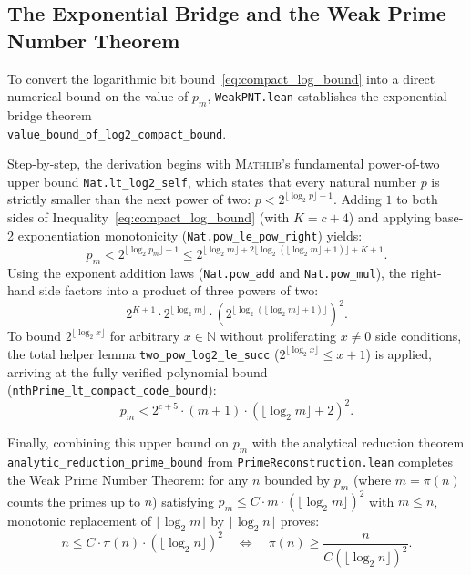 \documentclass[acmsmall,natbib=false,nonacm]{acmart}
\begin{document}
\subsection{The Exponential Bridge and the Weak Prime Number Theorem}
To convert the logarithmic bit bound~\eqref{eq:compact_log_bound} into a direct numerical bound on the value of $p_m$, \texttt{WeakPNT.lean} establishes the exponential bridge theorem \\ \texttt{value\_bound\_of\_log2\_compact\_bound}.

Step-by-step, the derivation begins with \textsc{Mathlib}'s fundamental power-of-two upper bound \texttt{Nat.lt\_log2\_self}, which states that every natural number $p$ is strictly smaller than the next power of two: $p < 2^{\lfloor\log_2 p\rfloor + 1}$. Adding $1$ to both sides of Inequality~\eqref{eq:compact_log_bound} (with $K = c + 4$) and applying base-2 exponentiation monotonicity (\texttt{Nat.pow\_le\_pow\_right}) yields:
\begin{equation}
    p_m < 2^{\lfloor\log_2 p_m\rfloor + 1} \le 2^{\lfloor\log_2 m\rfloor + 2\lfloor\log_2(\lfloor\log_2 m\rfloor + 1)\rfloor + K + 1}.
\end{equation}
Using the exponent addition laws (\texttt{Nat.pow\_add} and \texttt{Nat.pow\_mul}), the right-hand side factors into a product of three powers of two:
\begin{equation}
    2^{K + 1} \cdot 2^{\lfloor\log_2 m\rfloor} \cdot \left(2^{\lfloor\log_2(\lfloor\log_2 m\rfloor + 1)\rfloor}\right)^2.
\end{equation}
To bound $2^{\lfloor\log_2 x\rfloor}$ for arbitrary $x \in \mathbb{N}$ without proliferating $x \neq 0$ side conditions, the total helper lemma \texttt{two\_pow\_log2\_le\_succ} ($2^{\lfloor\log_2 x\rfloor} \le x + 1$) is applied, arriving at the fully verified polynomial bound (\texttt{nthPrime\_lt\_compact\_code\_bound}):
\begin{equation}
    \label{eq:value_prime_bound}
    p_m < 2^{c + 5} \cdot (m + 1) \cdot (\lfloor\log_2 m\rfloor + 2)^2.
\end{equation}

Finally, combining this upper bound on $p_m$ with the analytical reduction theorem \\ \texttt{analytic\_reduction\_prime\_bound} from \texttt{PrimeReconstruction.lean} completes the Weak Prime Number Theorem: for any $n$ bounded by $p_m$ (where $m = \pi(n)$ counts the primes up to $n$) satisfying $p_m \le C \cdot m \cdot (\lfloor\log_2 m\rfloor)^2$ with $m \le n$, monotonic replacement of $\lfloor\log_2 m\rfloor$ by $\lfloor\log_2 n\rfloor$ proves:
\begin{equation}
    n \le C \cdot \pi(n) \cdot (\lfloor\log_2 n\rfloor)^2 \quad \Longleftrightarrow \quad \pi(n) \ge \frac{n}{C (\lfloor\log_2 n\rfloor)^2}.
\end{equation}
\end{document}
